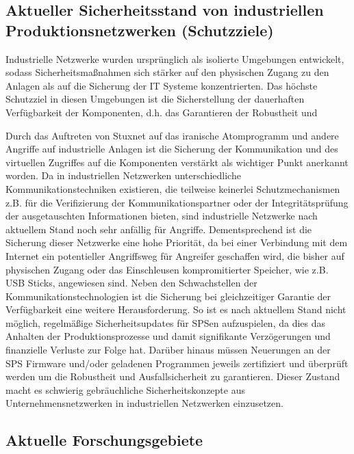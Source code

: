 \subsection{Aktueller Sicherheitsstand von industriellen Produktionsnetzwerken (Schutzziele)}
Industrielle Netzwerke wurden ursprünglich als isolierte Umgebungen entwickelt, sodass Sicherheitsmaßnahmen sich stärker auf den physischen Zugang zu den Anlagen als auf die Sicherung der IT Systeme konzentrierten. Das höchste Schutzziel in diesen Umgebungen ist die Sicherstellung der dauerhaften Verfügbarkeit der Komponenten, d.h. das Garantieren der Robustheit und 

Durch das Auftreten von Stuxnet auf das iranische Atomprogramm und andere Angriffe auf industrielle Anlagen ist die Sicherung der Kommunikation und des virtuellen Zugriffes auf die Komponenten verstärkt als wichtiger Punkt anerkannt worden. Da in industriellen Netzwerken unterschiedliche Kommunikationstechniken existieren, die teilweise keinerlei Schutzmechanismen z.B. für die Verifizierung der Kommunikationspartner oder der Integritätsprüfung der ausgetauschten Informationen bieten, sind industrielle Netzwerke nach aktuellem Stand noch sehr anfällig für Angriffe. Dementsprechend ist die Sicherung dieser Netzwerke eine hohe Priorität, da bei einer Verbindung mit dem Internet ein potentieller Angriffsweg für Angreifer geschaffen wird, die bisher auf physischen Zugang oder das Einschleusen kompromitierter Speicher, wie z.B. USB Sticks, angewiesen sind. 
Neben den Schwachstellen der Kommunikationstechnologien ist die Sicherung bei gleichzeitiger Garantie der Verfügbarkeit eine weitere Herausforderung. So ist es nach aktuellem Stand nicht möglich, regelmäßige Sicherheitsupdates für SPSen aufzuspielen, da dies das Anhalten der Produktionsprozesse und damit signifikante Verzögerungen und finanzielle Verluste zur Folge hat. Darüber hinaus müssen Neuerungen an der SPS Firmware und/oder geladenen Programmen jeweils zertifiziert und überprüft werden um die Robustheit und Ausfallsicherheit zu garantieren. Dieser Zustand macht es schwierig gebräuchliche Sicherheitskonzepte aus Unternehmensnetzwerken in industriellen Netzwerken einzusetzen.

\subsection{Aktuelle Forschungsgebiete}

